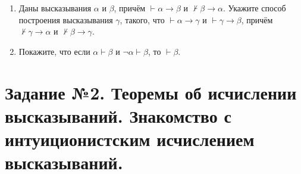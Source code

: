 \documentclass[10pt,a4paper,oneside]{article}
\begin{document}
\begin{enumerate}
\item Даны высказывания $\alpha$ и $\beta$, причём $\vdash \alpha\rightarrow\beta$ и $\not\vdash\beta\rightarrow\alpha$. 
Укажите способ построения высказывания $\gamma$, такого, что
$\vdash\alpha\rightarrow\gamma$ и $\vdash\gamma\rightarrow\beta$, причём $\not\vdash\gamma\rightarrow\alpha$ и
$\not\vdash\beta\rightarrow\gamma$.

\item Покажите, что если $\alpha \vdash \beta$ и $\neg\alpha\vdash\beta$, то $\vdash\beta$.
\end{enumerate}

\section*{Задание №2. Теоремы об исчислении высказываний. Знакомство с интуиционистским исчислением высказываний.}
\end{document}
